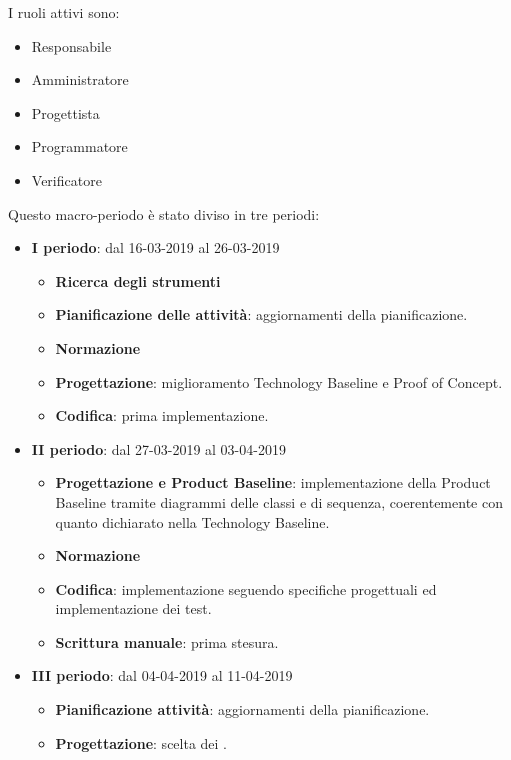         I ruoli attivi sono: 
        \begin{itemize}
            \item Responsabile
            \item Amministratore
            \item Progettista
            \item Programmatore
            \item Verificatore
        \end{itemize}
        Questo macro-periodo è stato diviso in tre periodi:
		\begin{itemize}
			\item \textbf{I periodo}: dal 16-03-2019 al 26-03-2019
			\begin{itemize}
    	        \item \textbf{Ricerca degli strumenti}
    	        \item \textbf{Pianificazione delle attività}: aggiornamenti della pianificazione.
    	        \item \textbf{Normazione}
    	        \item \textbf{Progettazione}: miglioramento Technology Baseline e Proof of Concept.
    	        \item \textbf{Codifica}: prima implementazione.
        	\end{itemize}
			\item \textbf{II periodo}: dal 27-03-2019 al 03-04-2019
			\begin{itemize}
				\item \textbf{Progettazione e Product Baseline}: implementazione della Product Baseline tramite diagrammi delle classi e di sequenza,
				coerentemente con quanto dichiarato nella Technology Baseline.
    	        \item \textbf{Normazione}
    	        \item \textbf{Codifica}: implementazione seguendo specifiche progettuali ed implementazione dei test.
    	        \item \textbf{Scrittura manuale}: prima stesura.
        	\end{itemize}
        	\item \textbf{III periodo}: dal 04-04-2019 al 11-04-2019
			\begin{itemize}
				\item \textbf{Pianificazione attività}: aggiornamenti della pianificazione.
    	        \item \textbf{Progettazione}: scelta dei .

\end{itemize}
\end{itemize}
